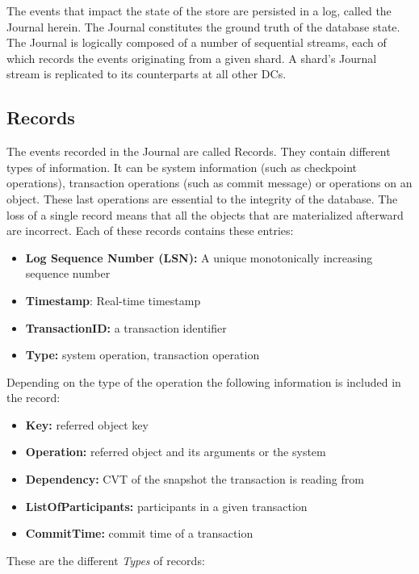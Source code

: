 \documentclass[twoside]{article}
\begin{document}
The events that impact the state of the store are persisted in a log, called the
Journal herein. 
The Journal constitutes the ground truth of the database state. 
The Journal is logically composed of a number of sequential streams, each of
which records the events originating from a given shard. 
A shard’s Journal stream is replicated to its counterparts at all other DCs. 

\subsection{Records}
\label{sec:record}

The events recorded in the Journal are called Records.
They contain different types of information. 
It can be system information (such as checkpoint operations), transaction
operations (such as commit message) or operations on an object.
These last operations are essential to the integrity of the database.
The loss of a single record means that all the objects that are materialized
afterward are incorrect.
Each of these records contains these entries:
\begin{itemize}
  \item \textbf{Log Sequence Number (LSN):} A unique monotonically increasing 
  sequence number
  \item \textbf{Timestamp}: Real-time timestamp 
  \item \textbf{TransactionID:} a transaction identifier 
  \item \textbf{Type:} system operation, transaction operation
\end{itemize}
Depending on the type of the operation the following information is included
in the record:
\begin{itemize}
  \item \textbf{Key:} referred object key
  \item \textbf{Operation:} referred object and its arguments or the system 
  \item \textbf{Dependency:} CVT of the snapshot the transaction is reading from
  \item \textbf{ListOfParticipants:} participants in a given transaction
  \item \textbf{CommitTime:} commit time of a transaction
\end{itemize}

These are the different \textit{Types} of records:
\end{document}
